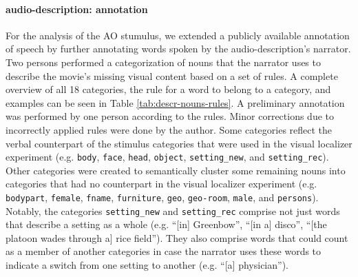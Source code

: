 \documentclass[english]{article}
\begin{document}
\paragraph{audio-description: annotation}

For the analysis of the AO stumulus, we extended a publicly available annotation
of speech \citep{haeusler2020speechanno} by further annotating words spoken by
the audio-description's narrator.
Two persons performed a categorization of nouns that the narrator uses to
describe the movie's missing visual content based on a set of rules.
A complete overview of all 18 categories, the rule for a word to belong to a
category, and examples can be seen in Table \ref{tab:descr-nouns-rules}.
A preliminary annotation was performed by one person according to the rules.
Minor corrections due to incorrectly applied rules were done by the author.
Some categories reflect the verbal counterpart of the stimulus categories that
were used in the visual localizer experiment (e.g. \texttt{body}, \texttt{face},
\texttt{head}, \texttt{object}, \texttt{setting\_new}, and
\texttt{setting\_rec}).
Other categories were created to semantically cluster some remaining nouns into
categories that had no counterpart in the visual localizer experiment (e.g.
\texttt{bodypart}, \texttt{female}, \texttt{fname}, \texttt{furniture},
\texttt{geo}, \texttt{geo-room}, \texttt{male}, and \texttt{persons}).
Notably, the categories \texttt{setting\_new} and \texttt{setting\_rec} comprise
not just words that describe a setting as a whole (e.g. ``[in] Greenbow'', ``[in
a] disco'', ``[the platoon wades through a] rice field''). They also comprise
words that could count as a member of another categories in case the narrator
uses these words to indicate a switch from one setting to another (e.g. ``[a]
physician'').
\end{document}
